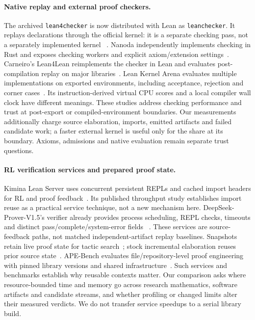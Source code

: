 \documentclass[10pt,twocolumn]{article}
\begin{document}
\paragraph{Native replay and external proof checkers.}
The archived \texttt{lean4checker} is now distributed with Lean as
\texttt{leanchecker}. It replays declarations through the official kernel:
it is a separate checking pass, not a separately implemented kernel
~\cite{leanCheckerDocs}.
Nanoda independently implements checking in Rust and exposes checking workers
and explicit axiom/extension settings~\cite{nanoda2026}.
Carneiro's Lean4Lean reimplements the checker in Lean and evaluates
post-compilation replay on major libraries~\cite{lean4lean2025}.
Lean Kernel Arena evaluates multiple implementations on exported environments,
including acceptance, rejection and corner cases~\cite{leanArena}.
Its instruction-derived virtual CPU scores and a local compiler wall clock
have different meanings.
These studies address checking performance and trust at post-export or
compiled-environment boundaries. Our measurements additionally charge
source elaboration, imports, emitted artifacts and failed candidate work;
a faster external kernel is useful only for the share at its boundary.
Axioms, admissions and native evaluation remain separate trust questions.

\paragraph{RL verification services and prepared proof state.}
Kimina Lean Server uses concurrent persistent REPLs and cached import headers
for RL and proof feedback~\cite{kimina,kiminaPaper}.
Its published throughput study establishes import reuse as a practical
service technique, not a new mechanism here.
DeepSeek-Prover-V1.5's verifier already provides process scheduling, REPL
checks, timeouts and distinct pass/complete/system-error fields
~\cite{deepseekVerifierArtifact}. These services are source-feedback paths,
not matched independent-artifact replay baselines.
Snapshots retain live proof state for tactic search~\cite{leanSnapshot};
stock incremental elaboration reuses prior source state~\cite{leanIncremental}.
APE-Bench evaluates file/repository-level proof engineering with pinned
library versions and shared infrastructure~\cite{apeBench2026}.
Such services and benchmarks establish why reusable contexts matter.
Our comparison asks where resource-bounded time and memory go across
research mathematics, software artifacts and candidate streams, and whether
profiling or changed limits alter their measured verdicts.
We do not transfer service speedups to a serial library build.
\end{document}

